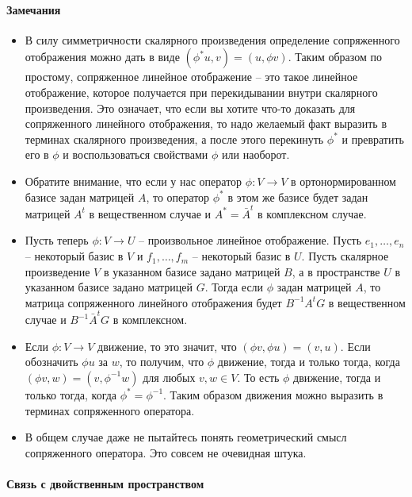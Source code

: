\paragraph{Замечания}

\begin{itemize}
\item В силу симметричности скалярного произведения определение сопряженного отображения можно дать в виде $(\phi^* u, v) = (u, \phi v)$.
Таким образом по простому, сопряженное линейное отображение  -- это такое линейное отображение, которое получается при перекидывании внутри скалярного произведения.
Это означает, что если вы хотите что-то доказать для сопряженного линейного отображения, то надо желаемый факт выразить в терминах скалярного произведения, а после этого перекинуть $\phi^*$ и превратить его в $\phi$ и воспользоваться свойствами $\phi$ или наоборот.

\item Обратите внимание, что если у нас оператор $\phi\colon V\to V$ в ортонормированном базисе задан матрицей $A$, то оператор $\phi^*$ в этом же базисе будет задан матрицей $A^t$ в вещественном случае и $A^* = \bar A^t$ в комплексном случае.

\item Пусть теперь $\phi\colon V\to U$ -- произвольное линейное отображение.
Пусть $e_1,\ldots,e_n$ -- некоторый базис в $V$ и $f_1,\ldots, f_m$ -- некоторый базис в $U$.
Пусть скалярное произведение $V$ в указанном базисе задано матрицей $B$, а в пространстве $U$ в указанном базисе задано матрицей $G$.
Тогда если $\phi$ задан матрицей $A$, то матрица сопряженного линейного отображения будет $B^{-1} A^t G$ в вещественном случае и $B^{-1}\bar A^t G$ в комплексном.

\item Если $\phi\colon V\to V$ движение, то это значит, что $(\phi v, \phi u) = (v, u)$.
Если обозначить $\phi u $ за $w$, то получим, что $\phi$ движение, тогда и только тогда, когда $(\phi v, w) = (v, \phi^{-1}w)$ для любых $v,w\in V$.
То есть $\phi$ движение, тогда и только тогда, когда $\phi^* = \phi^{-1}$.
Таким образом движения можно выразить в терминах сопряженного оператора.

\item В общем случае даже не пытайтесь понять геометрический смысл сопряженного оператора.
Это совсем не очевидная штука.
\end{itemize}

\paragraph{Связь с двойственным пространством}

